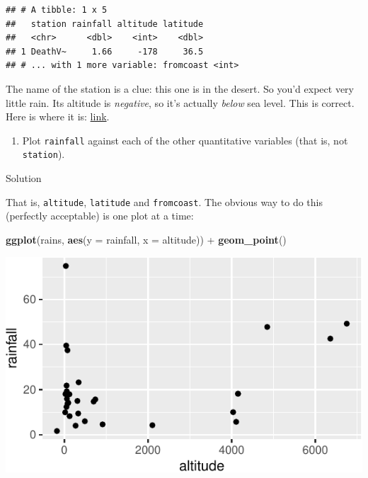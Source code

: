 \documentclass[]{tufte-book}
\newenvironment{Shaded}{}{}
\newcommand{\DataTypeTok}[1]{\textcolor[rgb]{0.56,0.13,0.00}{#1}}
\newcommand{\DecValTok}[1]{\textcolor[rgb]{0.25,0.63,0.44}{#1}}
\newcommand{\KeywordTok}[1]{\textcolor[rgb]{0.00,0.44,0.13}{\textbf{#1}}}
\newcommand{\NormalTok}[1]{#1}
\newcommand{\OperatorTok}[1]{\textcolor[rgb]{0.40,0.40,0.40}{#1}}
\newcommand{\StringTok}[1]{\textcolor[rgb]{0.25,0.44,0.63}{#1}}
\providecommand{\tightlist}{%
  \setlength{\itemsep}{0pt}\setlength{\parskip}{0pt}}
\theoremstyle{definition}
\theoremstyle{definition}
\theoremstyle{definition}
\theoremstyle{remark}
\begin{document}
\begin{Shaded}
\end{Shaded}

\begin{verbatim}
## # A tibble: 1 x 5
##   station rainfall altitude latitude
##   <chr>      <dbl>    <int>    <dbl>
## 1 DeathV~     1.66     -178     36.5
## # ... with 1 more variable: fromcoast <int>
\end{verbatim}

The name of the station is a clue: this one is in the desert. So you'd
expect very little rain. Its altitude is \emph{negative}, so it's
actually \emph{below} sea level. This is correct. Here is where it is:
\href{https://www.google.ca/maps/place/Death+Valley,+CA,+USA/@36.6341288,-118.2252974,7.75z/data=!4m5!3m4!1s0x80c739a21e8fffb1:0x1c897383d723dd25!8m2!3d36.5322649!4d-116.9325408}{link}.

\begin{enumerate}
\def\labelenumi{(\alph{enumi})}
\setcounter{enumi}{2}
\tightlist
\item
  Plot \texttt{rainfall} against each of the other quantitative
  variables (that is, not \texttt{station}).
\end{enumerate}

Solution

That is, \texttt{altitude}, \texttt{latitude} and \texttt{fromcoast}.
The obvious way to do this (perfectly acceptable) is one plot at a time:

\begin{Shaded}
\begin{Highlighting}[]
\KeywordTok{ggplot}\NormalTok{(rains, }\KeywordTok{aes}\NormalTok{(}\DataTypeTok{y =}\NormalTok{ rainfall, }\DataTypeTok{x =}\NormalTok{ altitude)) }\OperatorTok{+}\StringTok{ }
\StringTok{    }\KeywordTok{geom_point}\NormalTok{()}
\end{Highlighting}
\end{Shaded}

\includegraphics{12-regression_files/figure-latex/unnamed-chunk-8-1}
\end{document}
